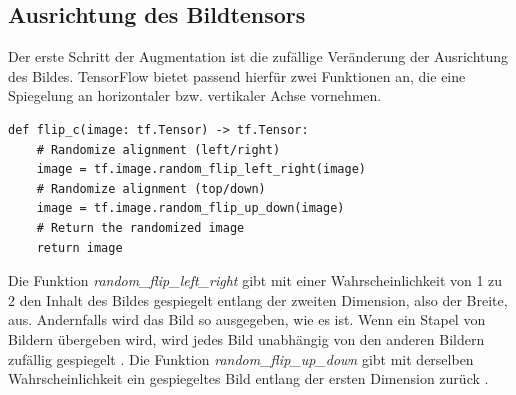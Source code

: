 \subsection{Ausrichtung des Bildtensors}

Der erste Schritt der Augmentation ist die zufällige Veränderung der Ausrichtung des Bildes. TensorFlow bietet passend hierfür zwei Funktionen an, die eine Spiegelung an horizontaler bzw. vertikaler Achse vornehmen.

\vspace*{10mm}

\begin{lstlisting}[caption={Python Funktion zum zufälligen Ändern der Ausrichtung}]
	def flip_c(image: tf.Tensor) -> tf.Tensor:
    # Randomize alignment (left/right)
    image = tf.image.random_flip_left_right(image)
    # Randomize alignment (top/down)
    image = tf.image.random_flip_up_down(image)
    # Return the randomized image
    return image
\end{lstlisting}

Die Funktion \emph{random\_flip\_left\_right} gibt mit einer Wahrscheinlichkeit von 1 zu 2 den Inhalt des Bildes gespiegelt entlang der zweiten Dimension, also der Breite, aus. Andernfalls wird das Bild so ausgegeben, wie es ist. Wenn ein Stapel von Bildern übergeben wird, wird jedes Bild unabhängig von den anderen Bildern zufällig gespiegelt \cite{tf_r_f_l_r}. Die Funktion \emph{random\_flip\_up\_down} gibt mit derselben Wahrscheinlichkeit ein gespiegeltes Bild entlang der ersten Dimension zurück \cite{tf_r_f_u_d}. 

